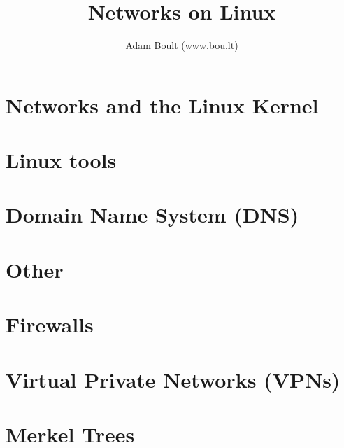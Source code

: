\documentclass[oneside]{book}
\begin{document}
\author{Adam Boult (www.bou.lt)}
\title{Networks on Linux}
\maketitle

\setcounter{tocdepth}{0}
\tableofcontents



\part{Networks and the Linux Kernel}

\part{Linux tools}






\part{Domain Name System (DNS)}




\part{Other}






\part{Firewalls}


\part{Virtual Private Networks (VPNs)}


\part{Merkel Trees}

\end{document}

